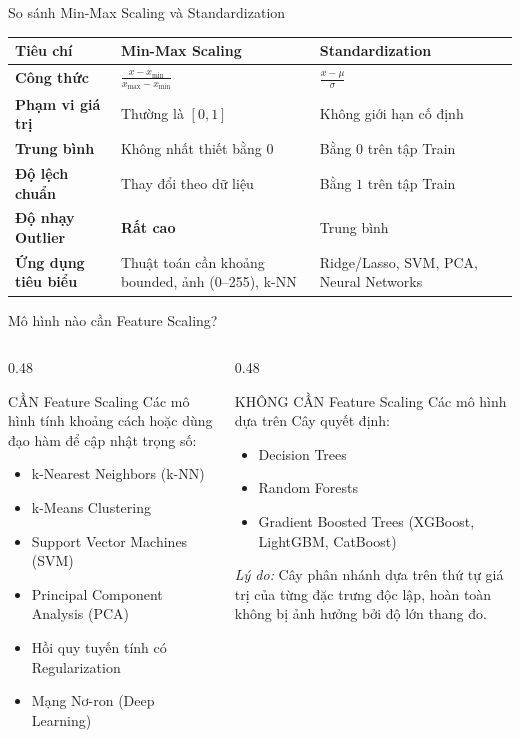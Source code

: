 \documentclass[aspectratio=169,11pt]{beamer}
\newcommand{\smallgap}{\vspace{0.35em}}
\begin{document}
\begin{frame}{So sánh Min-Max Scaling và Standardization}
\small
\begin{tabularx}{\textwidth}{lXX}
\toprule
\textbf{Tiêu chí} & \textbf{Min-Max Scaling} & \textbf{Standardization} \\
\midrule
\textbf{Công thức} & $\frac{x - x_{\min}}{x_{\max} - x_{\min}}$ & $\frac{x - \mu}{\sigma}$ \\
\textbf{Phạm vi giá trị} & Thường là $[0, 1]$ & Không giới hạn cố định \\
\textbf{Trung bình} & Không nhất thiết bằng $0$ & Bằng $0$ trên tập Train \\
\textbf{Độ lệch chuẩn} & Thay đổi theo dữ liệu & Bằng $1$ trên tập Train \\
\textbf{Độ nhạy Outlier} & \textbf{Rất cao} & Trung bình \\
\textbf{Ứng dụng tiêu biểu} & Thuật toán cần khoảng bounded, ảnh (0--255), k-NN & Ridge/Lasso, SVM, PCA, Neural Networks \\
\bottomrule
\end{tabularx}
\end{frame}

\begin{frame}{Mô hình nào cần Feature Scaling?}
\begin{columns}[T]
\begin{column}{0.48\textwidth}
\begin{block}{CẦN Feature Scaling}
Các mô hình tính khoảng cách hoặc dùng đạo hàm để cập nhật trọng số:
\begin{itemize}
  \item k-Nearest Neighbors (k-NN)
  \item k-Means Clustering
  \item Support Vector Machines (SVM)
  \item Principal Component Analysis (PCA)
  \item Hồi quy tuyến tính có Regularization
  \item Mạng Nơ-ron (Deep Learning)
\end{itemize}
\end{block}
\end{column}
\begin{column}{0.48\textwidth}
\begin{block}{KHÔNG CẦN Feature Scaling}
Các mô hình dựa trên Cây quyết định:
\begin{itemize}
  \item Decision Trees
  \item Random Forests
  \item Gradient Boosted Trees (XGBoost, LightGBM, CatBoost)
\end{itemize}
\smallgap
\textit{Lý do:} Cây phân nhánh dựa trên thứ tự giá trị của từng đặc trưng độc lập, hoàn toàn không bị ảnh hưởng bởi độ lớn thang đo.
\end{block}
\end{column}
\end{columns}
\end{frame}
\end{document}
